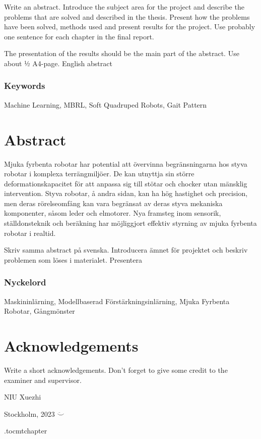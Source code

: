 \vspace{2cm}
Write an abstract. Introduce the subject area for the project and describe the problems that are solved and described in the thesis. Present how the problems have been solved, methods used and present results for the project. Use probably one sentence for each chapter in the final report.

The presentation of the results should be the main part of the abstract. Use about ½ A4-page.
English abstract




\subsection*{Keywords}
Machine Learning, \ac{MBRL}, Soft Quadruped Robots, Gait Pattern





\newpage
\thispagestyle{plain}
\chapter*{Abstract}
Mjuka fyrbenta robotar har potential att övervinna begränsningarna hos styva robotar i komplexa terrängmiljöer. De kan utnyttja sin större deformationskapacitet för att anpassa sig till stötar och chocker utan mänsklig intervention. Styva robotar, å andra sidan, kan ha hög hastighet och precision, men deras rörelseomfång kan vara begränsat av deras styva mekaniska komponenter, såsom leder och elmotorer. Nya framsteg inom sensorik, ställdonsteknik och beräkning har möjliggjort effektiv styrning av mjuka fyrbenta robotar i realtid.


Skriv samma abstract på svenska. Introducera ämnet för projektet och beskriv problemen som löses i materialet. Presentera 

\subsection*{Nyckelord}
Maskininlärning, Modellbaserad Förstärkningsinlärning, Mjuka Fyrbenta Robotar, Gångmönster


\newpage
\thispagestyle{plain}
\chapter*{Acknowledgements}
Write a short acknowledgements. Don't forget to give some credit to the examiner and supervisor.

\vspace{2cm}
\hfill NIU Xuezhi 

\hfill Stockholm, \monthname{ }2023 $\ddot\smile$

\newpage



\newpage

\etocdepthtag.toc{mtchapter}
\thispagestyle{plain}
\tableofcontents

\newpage


